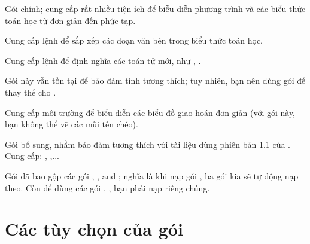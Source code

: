\medskip
\begin{lentry}
\item[\pkg{amsmath}]
	Gói chính; cung cấp rất nhiều tiện ích để biễu diễn phương trình
	và các biểu thức toán học từ đơn giản đến phức tạp.

\item[\pkg{amstext}]
	Cung cấp lệnh  để sắp xếp các đoạn văn bên trong
	biểu thức toán học.

\item[\pkg{amsopn}]
	Cung cấp lệnh  để định nghĩa
	các toán tử mới, như , .

\item[\pkg{amsbsy}]
	Gói này vẫn tồn tại để bảo đảm tính tương thích; tuy nhiên,
	bạn nên dùng gói  để thay thế cho .

\item[\pkg{amscd}]
	Cung cấp môi trường  để biểu diễn các biểu đồ giao hoán
	đơn giản (với gói này, bạn không thể vẽ các mũi tên chéo).

\item[\pkg{amsxtra}]
	Gói bổ sung, nhằm bảo đảm tương thích với tài liệu dùng phiên bản 1.1
	của . Cung cấp: , ,...
\end{lentry}

\medskip
Gói  đã bao gộp các gói , , and
; nghĩa là khi nạp gói , ba gói kia sẽ tự động
nạp theo. Còn để dùng các gói , , bạn phải nạp riêng chúng.

\chapter{Các tùy chọn của gói }\label{options}

